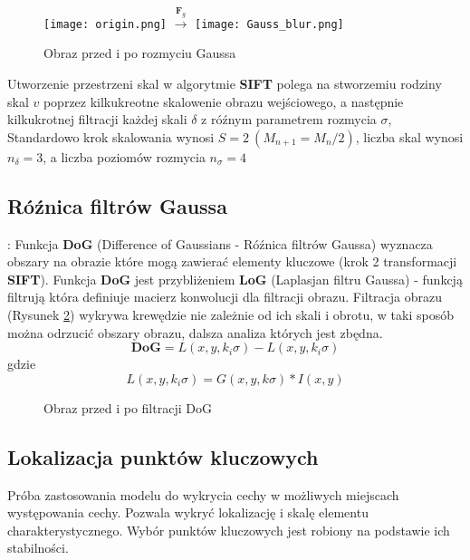    \begin{figure}[h]
      \centering
      \texttt{[image: origin.png]}
      \Large{$ \xrightarrow{\mathbf{F}_{g}} $}
      \texttt{[image: Gauss\_blur.png]}
      \caption{Obraz przed i po rozmyciu Gaussa}
      \label {fig:gauss_blur}
   \end{figure}

   Utworzenie przestrzeni skal w algorytmie \textbf{SIFT} polega na stworzemiu rodziny skal $v$ poprzez kilkukreotne skalowenie obrazu wejściowego, a następnie kilkukrotnej filtracji każdej skali $\delta$ z róźnym parametrem rozmycia $\sigma$,
   Standardowo krok skalowania wynosi $ S = 2 \: (M_{n+1} = M_{n} / 2)$, liczba skal wynosi $ n_{\delta} = 3$, a liczba poziomów rozmycia $ n_{\sigma} = 4$

\subsection{Róźnica filtrów Gaussa}:
   Funkcja \textbf{DoG} (Difference of Gaussians - Róźnica filtrów Gaussa) wyznacza obszary na obrazie które mogą zawierać elementy kluczowe (krok 2 transformacji \textbf{SIFT}). Funkcja \textbf{DoG} jest przybliżeniem \textbf{LoG} (Laplasjan filtru Gaussa) - funkcją filtrują która definiuje macierz konwolucji dla filtracji obrazu. Filtracja obrazu (Rysunek \ref{fig:DoG})  wykrywa krewędzie nie zależnie od ich skali i obrotu, w taki sposób można odrzucić obszary obrazu, dalsza analiza których jest zbędna.
   \begin{equation} \label{eq:DoG}
      \mathbf{DoG} = L(x, y, k_i \sigma) - L(x, y, k_i \sigma)
   \end{equation}
   gdzie
   \begin{equation} \label{eq:DoG}
      L(x, y, k_i \sigma) = G(x, y, k\sigma) * I(x, y)
   \end{equation}

   \begin{figure}[h]
      \centering
      \smallskip{ }
      \smallskip{ }
   \caption{Obraz przed i po filtracji DoG}
   \label {fig:DoG}
   \end{figure}



\subsection{Lokalizacja punktów kluczowych}
      Próba zastosowania modelu do wykrycia cechy w możliwych miejscach występowania cechy. Pozwala wykryć lokalizację i skalę elementu charakterystycznego. Wybór punktów kluczowych jest robiony na podstawie ich stabilności.

